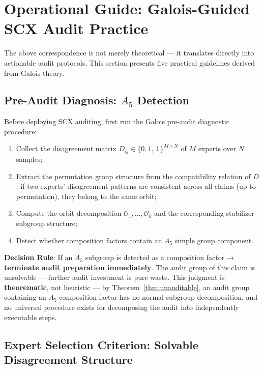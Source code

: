 \documentclass[10pt,a4paper]{article}
\theoremstyle{remark}
\begin{document}
\section{Operational Guide: Galois-Guided SCX Audit Practice}

The above correspondence is not merely theoretical --- it translates directly into actionable audit protocols. This section presents five practical guidelines derived from Galois theory.

\subsection{Pre-Audit Diagnosis: $A_5$ Detection}

Before deploying SCX auditing, first run the Galois pre-audit diagnostic procedure:

\begin{enumerate}[label=Step \arabic*:]
  \item Collect the disagreement matrix $D_{ij} \in \{0,1,\bot\}^{M\times N}$ of $M$ experts over $N$ samples;
  \item Extract the permutation group structure from the compatibility relation of $D$: if two experts' disagreement patterns are consistent across all claims (up to permutation), they belong to the same orbit;
  \item Compute the orbit decomposition $\mathcal{O}_1, \ldots, \mathcal{O}_k$ and the corresponding stabilizer subgroup structure;
  \item Detect whether composition factors contain an $A_5$ simple group component.
\end{enumerate}

\textbf{Decision Rule}: If an $A_5$ subgroup is detected as a composition factor → \textbf{terminate audit preparation immediately}. The audit group of this claim is unsolvable --- further audit investment is pure waste. This judgment is \textbf{theorematic}, not heuristic --- by Theorem~\ref{thm:unauditable}, an audit group containing an $A_5$ composition factor has no normal subgroup decomposition, and no universal procedure exists for decomposing the audit into independently executable steps.

\subsection{Expert Selection Criterion: Solvable Disagreement Structure}
\end{document}
